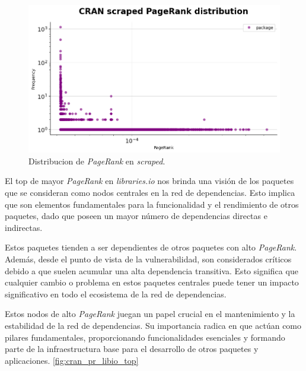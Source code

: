 \begin{figure}[h!]
    \begin{center}
        \includegraphics[width=1\textwidth]{img/cran/pr2.png}
        \caption{Distribucion de \textit{PageRank} en \textit{scraped}.}
        \label{fig:cran_pr_scraped}
    \end{center}
\end{figure}

El top de mayor \textit{PageRank} en \textit{libraries.io} nos brinda una visión de los paquetes que se
consideran como nodos centrales en la red de dependencias. Esto implica que son elementos fundamentales
para la funcionalidad y el rendimiento de otros paquetes, dado que poseen un mayor número de dependencias
directas e indirectas.

Estos paquetes tienden a ser dependientes de otros paquetes con alto \textit{PageRank}. Además, desde el
punto de vista de la vulnerabilidad, son considerados críticos debido a que suelen acumular una alta
dependencia transitiva. Esto significa que cualquier cambio o problema en estos paquetes centrales puede
tener un impacto significativo en todo el ecosistema de la red de dependencias.

Estos nodos de alto \textit{PageRank} juegan un papel crucial en el mantenimiento y la estabilidad de la
red de dependencias. Su importancia radica en que actúan como pilares fundamentales, proporcionando
funcionalidades esenciales y formando parte de la infraestructura base para el desarrollo de otros
paquetes y aplicaciones. \ref{fig:cran_pr_libio_top}

